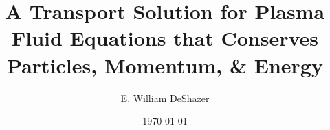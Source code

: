 \documentclass[]{article}
\title{A Transport Solution for Plasma Fluid Equations that Conserves Particles, Momentum, \& Energy}
\author{E. William DeShazer}
\date{\today}
\begin{document}
\maketitle

\mbox{}

%
%
%
%
%



%
%
%
%
%
%
%

\clearpage

\printnomenclature

%
\end{document}
